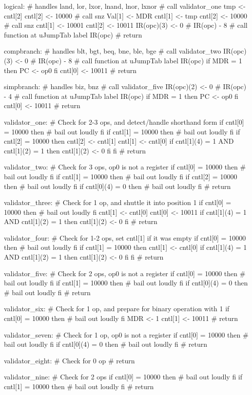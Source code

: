 \documentclass[12pt]{article}
\begin{document}
\begin{verbatimtab}
logical: # handles land, lor, lxor, lnand, lnor, lxnor
	# call validator_one
	tmp <- cntl[2]
	cntl[2] <- 10000
	# call snz
	Val[1] <- MDR
	cntl[1] <- tmp
	cntl[2] <- 10000
	# call snz
	cntl[1] <- 10001
	cntl[2] <- 10011
	IR(opc)(3) <- 0 # IR(opc) - 8
	# call function at uJumpTab label IR(opc)
	# return

compbranch: # handles blt, bgt, beq, bne, ble, bge
	# call validator_two
	IR(opc)(3) <- 0 # IR(opc) - 8
	# call function at uJumpTab label IR(opc)
	if MDR = 1 then
		PC <- op0
	fi
	cntl[0] <- 10011
	# return

simpbranch: # handles biz, bnz
	# call validator_five
	IR(opc)(2) <- 0 # IR(opc) - 4
	# call function at uJumpTab label IR(opc)
	if MDR = 1 then
		PC <- op0
	fi
	cntl[0] <- 10011
	# return

validator_one:
	# Check for 2-3 ops, and detect/handle shorthand form
	if cntl[0] = 10000 then
		# bail out loudly
	fi
	if cntl[1] = 10000 then
		# bail out loudly
	fi
	if cntl[2] = 10000 then
		cntl[2] <- cntl[1]
		cntl[1] <- cntl[0]
		if cntl[1](4) = 1 AND cntl[1](2) = 1 then
			cntl[1](2) <- 0
		fi
	fi
	# return

validator_two:
	# Check for 3 ops, op0 is not a register
	if cntl[0] = 10000 then
		# bail out loudly
	fi
	if cntl[1] = 10000 then
		# bail out loudly
	fi
	if cntl[2] = 10000 then
		# bail out loudly
	fi
	if cntl[0](4) = 0 then
		# bail out loudly
	fi
	# return

validator_three:
	# Check for 1 op, and shuttle it into position 1
	if cntl[0] = 10000 then
		# bail out loudly
	fi
	cntl[1] <- cntl[0]
	cntl[0] <- 10011
	if cntl[1](4) = 1 AND cntl[1](2) = 1 then
		cntl[1](2) <- 0
	fi
	# return

validator_four:
	# Check for 1-2 ops, set cntl[1] if it was empty
	if cntl[0] = 10000 then
		# bail out loudly
	fi
	if cntl[1] = 10000 then
		cntl[1] <- cntl[0]
		if cntl[1](4) = 1 AND cntl[1](2) = 1 then
			cntl[1](2) <- 0
		fi
	fi
	# return

validator_five:
	# Check for 2 ops, op0 is not a register
	if cntl[0] = 10000 then
		# bail out loudly
	fi
	if cntl[1] = 10000 then
		# bail out loudly
	fi
	if cntl[0](4) = 0 then
		# bail out loudly
	fi
	# return

validator_six:
	# Check for 1 op, and prepare for binary operation with 1
	if cntl[0] = 10000 then
		# bail out loudly
	fi
	MDR <- 1
	cntl[1] <- 10011
	# return

validator_seven:
	# Check for 1 op, op0 is not a register
	if cntl[0] = 10000 then
		# bail out loudly
	fi
	if cntl[0](4) = 0 then
		# bail out loudly
	fi
	# return

validator_eight:
	# Check for 0 op
	# return

validator_nine:
	# Check for 2 ops
	if cntl[0] = 10000 then
		# bail out loudly
	fi
	if cntl[1] = 10000 then
		# bail out loudly
	fi
	# return
\end{verbatimtab}
\end{document}
